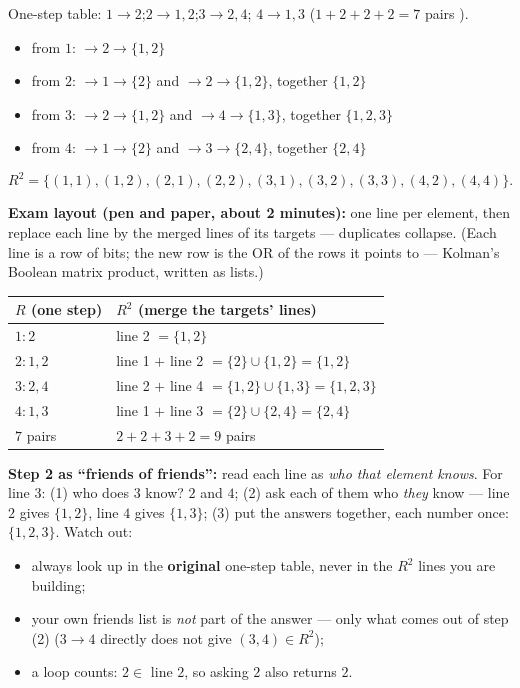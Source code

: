 \documentclass{fkt-notes}
\theoremstyle{definition}
\begin{document}
\begin{example}[$R = \{(1,2), (2,2), (3,4), (4,3), (2,1), (4,1), (3,2)\}$ on $\{1, 2, 3, 4\}$; find $R^2$]
  One-step table: $1 \to 2$;\quad $2 \to 1, 2$;\quad $3 \to 2, 4$;\quad
  $4 \to 1, 3$ \quad ($1 + 2 + 2 + 2 = 7$ pairs \checkmark).
  \begin{itemize}[nosep]
    \item from $1$: $\to 2 \to \{1, 2\}$
    \item from $2$: $\to 1 \to \{2\}$ and $\to 2 \to \{1, 2\}$, together $\{1, 2\}$
    \item from $3$: $\to 2 \to \{1, 2\}$ and $\to 4 \to \{1, 3\}$, together $\{1, 2, 3\}$
    \item from $4$: $\to 1 \to \{2\}$ and $\to 3 \to \{2, 4\}$, together $\{2, 4\}$
  \end{itemize}
  \[
    R^2 = \{(1,1), (1,2), (2,1), (2,2), (3,1), (3,2), (3,3), (4,2), (4,4)\}.
  \]
\end{example}

\noindent \textbf{Exam layout (pen and paper, about 2 minutes):} one line
per element, then replace each line by the merged lines of its
targets --- duplicates collapse. (Each line is a row of bits; the new
row is the OR of the rows it points to --- Kolman's Boolean matrix
product, written as lists.)
\begin{center}
  \begin{tabular}{@{}l@{\qquad}l@{}}
    \toprule
    $R$ (one step) & $R^2$ (merge the targets' lines)                           \\
    \midrule
    $1: 2$         & line 2 $= \{1, 2\}$                                        \\
    $2: 1, 2$      & line 1 $+$ line 2 $= \{2\} \cup \{1, 2\} = \{1, 2\}$       \\
    $3: 2, 4$      & line 2 $+$ line 4 $= \{1, 2\} \cup \{1, 3\} = \{1, 2, 3\}$ \\
    $4: 1, 3$      & line 1 $+$ line 3 $= \{2\} \cup \{2, 4\} = \{2, 4\}$       \\
    \midrule
    $7$ pairs      & $2 + 2 + 3 + 2 = 9$ pairs                                  \\
    \bottomrule
  \end{tabular}
\end{center}
%
\noindent \textbf{Step 2 as ``friends of friends'':} read each line as
\emph{who that element knows}. For line $3$: (1) who does $3$ know?
$2$ and $4$; (2) ask each of them who \emph{they} know --- line $2$
gives $\{1, 2\}$, line $4$ gives $\{1, 3\}$; (3) put the answers
together, each number once: $\{1, 2, 3\}$. Watch out:
\begin{itemize}[nosep]
  \item always look up in the \textbf{original} one-step table, never
        in the $R^2$ lines you are building;
  \item your own friends list is \emph{not} part of the answer --- only
        what comes out of step (2) ($3 \to 4$ directly does not give
        $(3,4) \in R^2$);
  \item a loop counts: $2 \in$ line $2$, so asking $2$ also returns $2$.
\end{itemize}
\end{document}
